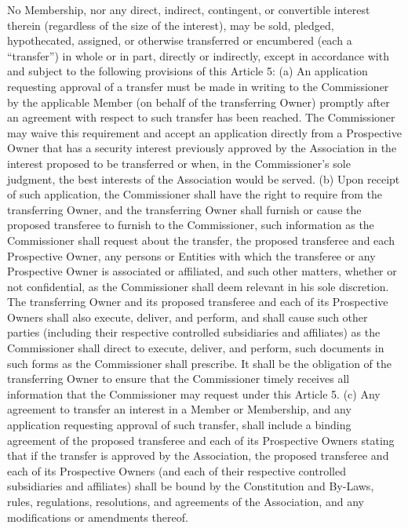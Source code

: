 \documentclass[]{book}
\begin{document}
No Membership, nor any direct, indirect, contingent, or convertible interest therein (regardless of the size of the interest), may be sold, pledged, hypothecated, assigned, or otherwise transferred or encumbered (each a ``transfer'') in whole or in part, directly or indirectly, except in accordance with and subject to the following provisions of this Article 5:
(a) An application requesting approval of a transfer must be made in writing to the Commissioner by the applicable Member (on behalf of the transferring Owner) promptly after an agreement with respect to such transfer has been reached. The Commissioner may waive this requirement and accept an application directly from a Prospective Owner that has a security interest previously approved by the Association in the interest proposed to be transferred or when, in the Commissioner's sole judgment, the best interests of the Association would be served.
(b) Upon receipt of such application, the Commissioner shall have the right to require from the transferring Owner, and the transferring Owner shall furnish or cause the proposed transferee to furnish to the Commissioner, such information as the Commissioner shall request about the transfer, the proposed transferee and each Prospective Owner, any persons or Entities with which the transferee or any Prospective Owner is associated or affiliated, and such other matters, whether or not confidential, as the Commissioner shall deem relevant in his sole discretion. The transferring Owner and its proposed transferee and each of its Prospective Owners shall also execute, deliver, and perform, and shall cause such other parties (including their respective controlled subsidiaries and affiliates) as the Commissioner shall direct to execute, deliver, and perform, such documents in such forms as the Commissioner shall prescribe. It shall be the obligation of the transferring Owner to ensure that the Commissioner timely receives all information that the Commissioner may request under this Article 5.
(c) Any agreement to transfer an interest in a Member or Membership, and any application requesting approval of such transfer, shall include a binding agreement of the proposed transferee and each of its Prospective Owners stating that if the transfer is approved by the Association, the proposed transferee and each of its Prospective Owners (and each of their respective controlled subsidiaries and affiliates) shall be bound by the Constitution and By-Laws, rules, regulations, resolutions, and agreements of the Association, and any modifications or amendments thereof.
\end{document}

